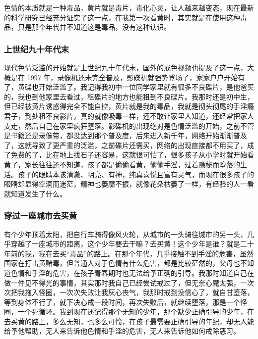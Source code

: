 色情的本质就是一种毒品，黄片就是毒片，毒化心灵，让人越来越变态，现在最新的科学研究已经充分证实了这一点，在我第一次看黄时，其实就是在使用这种毒品，只是那个年代并不知道这是毒品，没有这种认识。

\subsubsection{上世纪九十年代末}

现代色情泛滥的开始就是上世纪九十年代末，国外的戒色视频也提及了这一点，大概是在 1997 年，录像机还未完全普及，影碟机就强势登场了，家家户户开始有了，黄碟也开始泛滥了。我记得我初中一位同学家里就有很多不良碟片，是他爸买的，我也到他家里去看过，租碟片的地方也能租到不良碟片。我那时还是初中生，但已经被黄片诱惑得完全不能自控，黄片就是我的毒品，我就是彻头彻尾的手淫瘾君子，到处租不良影片，真的就像吸毒一样，还不敢让家里人知道，还经常把家人支走，然后自己在家里疯狂堕落。影碟机的出现绝对是色情泛滥的开始，之前不管是书籍还是录像带，都没达到那个普及度，后来进入新千年，网络开始渐渐普及了，这就导致了更严重的泛滥，之前碟片还需买，网络的出现直接都不用买了，成了免费的了，比在地上找石子还容易，这就很可怕了，很多孩子从小学时就开始看黄了，家长往往还不知道，孩子都是偷偷看黄，偷偷手淫，过着隐秘而堕落的生活。孩子的眼睛本该清澈、明亮、有神，纯真喜悦且富有灵气，而现在很多孩子的眼睛却显得空洞而迷茫，精神也萎靡不振，就像花朵枯萎了一样，有经验的人一看就知道发生了什么。

\subsubsection{穿过一座城市去买黄}

有个少年顶着太阳，把自行车骑得像风火轮，从城市的一头骑往城市的另一头，几乎穿越了一座城市的距离，这个少年要去干嘛？去买黄！这个少年是谁？就是二十年前的我，我在去买“毒品”的路上。在那个年代，几乎接触不到手淫的危害，虽然国家在打击黄赌毒，但普通人对于色情有什么危害，都是比较茫然的，父母也不知道色情和手淫的危害，在孩子青春期时也无法给予正确的引导。我那时知道自己在做一件见不得光的事情，其实那时我自己已经尝试戒过了，但无奈心魔太强，一次次把我拖入怪圈，一次次失败让我灰心丧气，我那时戒到没信心了，就自甘堕落，等到身体不行了，就下决心戒一段时间，再次失败后，就继续堕落，那是一个怪圈，一个死循环。我到现在还记得那个无知的少年，那个缺少正确引导的少年，在去买黄的路上，多么无知，也多么可怜，在孩子最需要正确引导的年纪，却无人能给予他帮助，无人来告诉他色情和手淫的危害，无人来告诉他如何戒除恶习。

